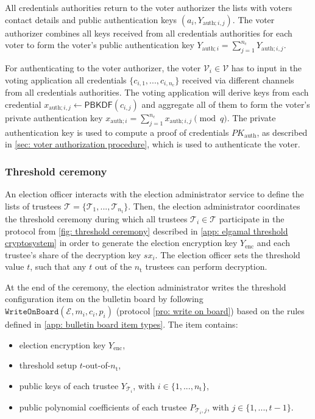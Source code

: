 All credentials authorities return to the voter authorizer the lists with voters contact details and public authentication keys $(a_i, Y_{\mathrm{auth}; i,j})$. The voter authorizer combines all keys received from all credentials authorities for each voter to form the voter's public authentication key $Y_{\mathrm{auth}; i} = \sum_{j=1}^{n_\mathrm{c}} Y_{\mathrm{auth}; i, j}$.

For authenticating to the voter authorizer, the voter $\mathcal{V}_i \in \boldsymbol{\mathcal{V}}$ has to input in the voting application all credentials $\{ c_{i, 1}, ..., c_{i, n_\mathrm{c}} \}$ received via different channels from all credentials authorities. The voting application will derive keys from each credential $x_{\mathrm{auth}; i, j} \gets \mathsf{PBKDF}(c_{i, j})$ and aggregate all of them to form the voter's private authentication key $x_{\mathrm{auth}; i} = \sum_{j=1}^{n_\mathrm{c}} x_{\mathrm{auth}; i, j} \pmod q$. The private authentication key is used to compute a proof of credentials $PK_\mathrm{auth}$, as described in \cref{sec: voter authorization procedure}, which is used to authenticate the voter.


\subsubsection{Threshold ceremony} \label{sec: threshold ceremony}
An election officer interacts with the election administrator service to define the lists of trustees $\boldsymbol{\mathcal{T}} = \{ \mathcal{T}_1, ..., \mathcal{T}_{n_\mathrm{t}} \}$. Then, the election administrator coordinates the threshold ceremony during which all trustees $\mathcal{T}_i \in \boldsymbol{\mathcal{T}}$ participate in the protocol from \cref{fig: threshold ceremony} described in \cref{app: elgamal threshold cryptosystem} in order to generate the election encryption key $Y_\mathrm{enc}$ and each trustee's share of the decryption key $sx_i$. The election officer sets the threshold value $t$, such that any $t$ out of the $n_\mathrm{t}$ trustees can perform decryption.

At the end of the ceremony, the election administrator writes the threshold configuration item on the bulletin board by following $\mathtt{WriteOnBoard}(\mathcal{E}, m_i, c_i, p_i)$ (protocol \ref{pro: write on board}) based on the rules defined in \cref{app: bulletin board item types}. The item contains:
\begin{itemize}
    \item election encryption key $Y_\mathrm{enc}$,
    \item threshold setup $t$-out-of-$n_\mathrm{t}$,
    \item public keys of each trustee $Y_{\mathcal{T}_i}$, with $i \in \{1, ..., n_\mathrm{t}\}$,
    \item public polynomial coefficients of each trustee $P_{\mathcal{T}_i,j}$, with $j \in \{1, ..., t-1 \}$.
\end{itemize}


